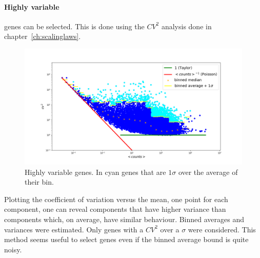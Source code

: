 \paragraph{Highly variable} genes can be selected. This is done using the $CV^2$ analysis done in chapter~\ref{ch:scalinglaws}.
\begin{figure}[htb!]
    \centering
    \includegraphics[width=0.8\linewidth]{pictures/topic/cvmean_oversigma.png}
    \caption{Highly variable genes. In \textcolor{pythoncyan}{cyan} genes that are $1 \sigma$ over the average of their bin.}
    \label{fig:topic/cvmean_oversigma}
\end{figure}
Plotting the coefficient of variation versus the mean, one point for each component, one can reveal components that have higher variance than components which, on average, have similar behaviour. Binned averages and variances were estimated. Only genes with a $CV^2$ over a $\sigma$ were considered. This method seems useful to select genes even if the binned average bound is quite noisy.

